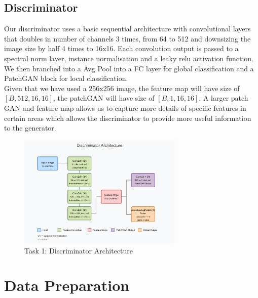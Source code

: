 \documentclass[twoside,english,notitlepage]{report}
\begin{document}
\subsection{Discriminator}\label{task1:discriminator}
Our discriminator uses a basic sequential architecture with convolutional layers that doubles in number of channels 3 times, from 64 to 512 and downsizing the image size by half 4 times to 16x16. Each convolution output is passed to a spectral norm layer, instance normalisation and a leaky relu activation function. We then branched into a Avg Pool into a FC layer for global classification and a PatchGAN block for local classification. \\

\noindent Given that we have used a 256x256 image, the feature map will have size of $[B, 512, 16, 16]$, the patchGAN will have size of $[B, 1, 16, 16]$. A larger patch GAN and feature map allows us to capture more details of specific features in certain areas which allows the discriminator to provide more useful information to the generator.


\begin{figure}[h]
    \centering
    \includegraphics[width=0.7\textwidth]{task1/discriminator-architecture.pdf}
    \caption{Task 1: Discriminator Architecture}
\end{figure}


\newpage
\section{Data Preparation}
\end{document}
